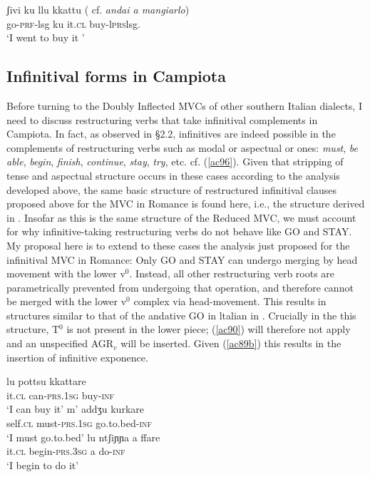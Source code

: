 \documentclass[output=paper]{langscibook}
\begin{document}
\ea \label{ac95} \gll  ʃivi  ku  llu kkattu ( cf. \textit{andai a mangiarlo})\\
  go-\textsc{prf}-lsg  ku  it.\textsc{cl} buy-l\textsc{prs}lsg. \\
 \glt ‘I went to buy it '
\z

\subsection{Infinitival forms in Campiota}

Before turning to the Doubly Inflected MVCs of other southern Italian dialects, I need to discuss restructuring verbs that take infinitival complements in Campiota. In fact, as observed in §2.2, infinitives are indeed possible in the complements of restructuring verbs such as modal or aspectual or ones: \textit{must},\textit{ be  able},  \textit{begin},  \textit{finish},  \textit{continue},  \textit{stay},  \textit{try}, etc. cf. (\ref{ac96}). Given that stripping of tense and aspectual structure occurs in these cases according to the analysis developed above, the same basic structure of restructured infinitival clauses proposed above for the MVC in Romance is found here, i.e., the structure derived in . Insofar as this is the same structure of the Reduced MVC, we must account for why infinitive-taking restructuring verbs do not behave like GO and STAY. My proposal here is to extend to these cases the analysis just proposed for the infinitival MVC in Romance: Only GO and STAY can undergo merging  by  head  movement  with  the  lower  v$^0$.  Instead, all other restructuring verb roots are parametrically prevented from undergoing that operation, and therefore cannot be merged with the lower v$^0$ complex via head-movement. This results in structures similar to that of the andative GO in ltalian in . Crucially in the this structure, T$^0$ is not present in the lower piece; (\ref{ac90}) will therefore not apply and an unspecified AGR$_v$ will be inserted.  Given (\ref{ac89b}) this results in the insertion of infinitive exponence.

\ea \label{ac96}
    \ea \gll lu      pottsu     kkattare\\
    it.\textsc{cl} can-\textsc{prs}.\textsc{1sg} buy-\textsc{inf}\\
    \glt `I can buy it'
    \ex \gll m’    addʒu      kurkare\\
    self.\textsc{cl}  must-\textsc{prs}.\textsc{1sg}   go.to.bed-\textsc{inf} \\
    \glt `I must go.to.bed'
    \ex \gll lu ntʃiɲɲa       a  ffare\\
    it.\textsc{cl} begin-\textsc{prs}.\textsc{3sg} a  do-\textsc{inf} \\
    \glt `I begin to do it'
    \z
\z
\end{document}
